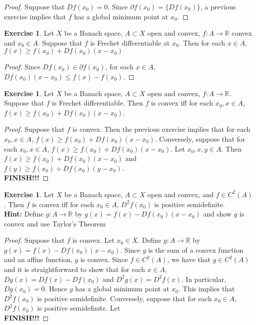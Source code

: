 \documentclass[12pt]{amsart}
\theoremstyle{definition}
\newtheorem{ex}[definition]{Exercise}
\newcommand{\R}{\mathbb{R}}
\newcommand{\p}{\partial}
\newcommand{\lex}[1]{\label{ex:#1}}
\begin{document}
	\begin{proof}
	Suppose that $Df(x_0) = 0$. Since $\p f(x_0) = \{Df(x_0)\}$, a previous exercise implies that $f$ has a global minimum point at $x_0$. 
	\end{proof}
	
	\begin{ex}
	Let $X$ be a Banach space, $A \subset X$ open and convex, $f:A \rightarrow \R$ convex and $x_0 \in A$. Suppose that $f$ is Frechet differentiable at $x_0$. Then for each $x \in A$, $f(x) \geq f(x_0) + Df(x_0)(x - x_0)$
	\end{ex}
	
	\begin{proof}
	Since $Df(x_0) \in \p f(x_0)$, for each $x \in A$, $Df(x_0)(x - x_0) \leq f(x) - f(x_0)$.
	\end{proof}
	
	\begin{ex}
	Let $X$ be a Banach space, $A \subset X$ open and convex, $f:A \rightarrow \R$. Suppose that $f$ is Frechet differentiable. Then $f$ is convex iff for each $x_0, x \in A$, $f(x) \geq f(x_0) + Df(x_0)(x - x_0)$.
	\end{ex}
	
	\begin{proof}
	Suppose that $f$ is convex. Then the previous exercise implies that for each $x_0,x \in A$, $f(x) \geq f(x_0) + Df(x_0)(x - x_0)$. Conversely, suppose that for each $x_0,x \in A$, $f(x) \geq f(x_0) + Df(x_0)(x - x_0)$. Let $x_0, x, y \in A$. Then $f(x) \geq f(x_0) + Df(x_0)(x - x_0)$ and $f(y) \geq f(x_0) + Df(x_0)(y - x_0)$. \\
	\textbf{FINISH!!!}
	\end{proof}
	
	\begin{ex} \lex{}
	Let $X$ be a Banach space, $A \subset X$ open and convex, and $f \in C^2(A)$. Then $f$ is convex iff for each $x_0 \in A$, $D^2f(x_0)$ is positive semidefinite.\\
	\textbf{Hint:} Define $g:A \rightarrow \R$ by $g(x) = f(x) - Df(x_0)(x - x_0)$ and show $g$ is convex and use Taylor's Theorem
	\end{ex}
	
	\begin{proof}
	Suppose that $f$ is convex. Let $x_0 \in X$. Define $g:A \rightarrow \R$ by $g(x) = f(x) - Df(x_0)(x - x_0)$. Since $g$ is the sum of a convex function and an affine function, $g$ is convex. Since $f \in C^2(A)$, we have that $g \in C^2(A)$ and it is straightforward to show that for each $x \in A$, $Dg(x) = Df(x) - Df(x_0)$ and $D^2g(x) = D^2f(x)$. In particular, $Dg(x_0) = 0$. Hence $g$ has a global minimum point at $x_0$. This implies that $D^2f(x_0)$ is positive semidefinite. 
	Conversely, suppose that for each $x_0 \in A$, $D^2f(x_0)$ is positive semidefinite. Let  \\
	\textbf{FINISH!!!}
	\end{proof}
	
\end{document}

